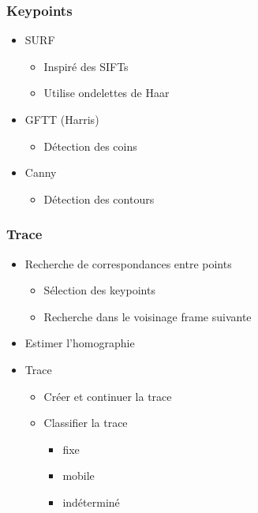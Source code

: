 \begin{frame}
  \frametitle{Keypoints}
  
  \begin{itemize}
  \item SURF
  	\begin{itemize}
  	\item Inspiré des SIFTs
  	\item Utilise ondelettes de Haar
  	\end{itemize}
  	
  \item GFTT (Harris)
	\begin{itemize}
  	\item Détection des coins
  	\end{itemize}
  	
  \item Canny
    \begin{itemize}
  	\item Détection des contours
  	\end{itemize}
  	
  \end{itemize}


\end{frame}



\begin{frame}
  \frametitle{Trace}
  \begin{itemize}
  \item Recherche de correspondances entre points
  	\begin{itemize}
  	\item Sélection des keypoints
  	\item Recherche dans le voisinage frame suivante
  	\end{itemize}
  \item Estimer l'homographie
  \item Trace
  	\begin{itemize}
  	\item Créer et continuer la trace
  	\item Classifier la trace
  	\begin{itemize}
  		\item fixe
  		\item mobile
  		\item indéterminé
  	\end{itemize}
  	\end{itemize}
  \end{itemize}
  


\end{frame}


